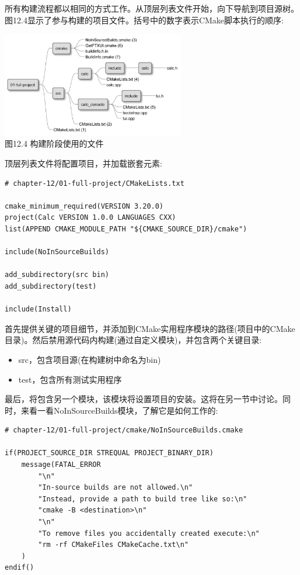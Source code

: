 
所有构建流程都以相同的方式工作。从顶层列表文件开始，向下导航到项目源树。图12.4显示了参与构建的项目文件。括号中的数字表示CMake脚本执行的顺序:

\begin{center}
\includegraphics[width=0.6\textwidth]{content/3/chapter12/images/4.jpg}\\
图12.4 构建阶段使用的文件
\end{center}

顶层列表文件将配置项目，并加载嵌套元素:

\begin{lstlisting}[style=styleCMake]
# chapter-12/01-full-project/CMakeLists.txt

cmake_minimum_required(VERSION 3.20.0)
project(Calc VERSION 1.0.0 LANGUAGES CXX)
list(APPEND CMAKE_MODULE_PATH "${CMAKE_SOURCE_DIR}/cmake")

include(NoInSourceBuilds)

add_subdirectory(src bin)
add_subdirectory(test)

include(Install)
\end{lstlisting}

首先提供关键的项目细节，并添加到CMake实用程序模块的路径(项目中的CMake目录)。然后禁用源代码内构建(通过自定义模块)，并包含两个关键目录:

\begin{itemize}
\item 
src，包含项目源(在构建树中命名为bin)

\item 
test，包含所有测试实用程序
\end{itemize}

最后，将包含另一个模块，该模块将设置项目的安装。这将在另一节中讨论。同时，来看一看NoInSourceBuilds模块，了解它是如何工作的:

\begin{lstlisting}[style=styleCMake]
# chapter-12/01-full-project/cmake/NoInSourceBuilds.cmake

if(PROJECT_SOURCE_DIR STREQUAL PROJECT_BINARY_DIR)
	message(FATAL_ERROR
		"\n"
		"In-source builds are not allowed.\n"
		"Instead, provide a path to build tree like so:\n"
		"cmake -B <destination>\n"
		"\n"
		"To remove files you accidentally created execute:\n"
		"rm -rf CMakeFiles CMakeCache.txt\n"
	)
endif()
\end{lstlisting}

